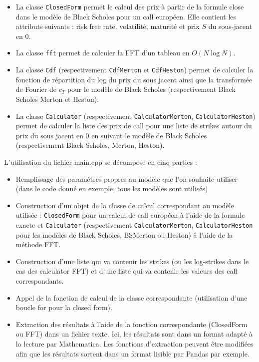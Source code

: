 \documentclass{article}
\begin{document}
\begin{itemize}
	\item La classe \lstinline{ClosedForm} permet le calcul des prix à partir de la formule close dans le modèle de Black Scholes pour un call européen. Elle contient les attributs suivants : risk free rate, volatilité, maturité et prix $S$ du sous-jacent en 0.
	\item La classe \lstinline{fft} permet de calculer la FFT d’un tableau en $O(N\log N)$.
	\item La classe \lstinline{Cdf} (respectivement \lstinline{CdfMerton} et \lstinline{CdfHeston}) permet de calculer la fonction de répartition du log du prix du sous jacent ainsi que la transformée de Fourier de $c_T$ pour le modèle de Black Scholes (respectivement Black Scholes Merton et Heston).
	\item La classe \lstinline{Calculator} (respectivement \lstinline{CalculatorMerton}, \lstinline{CalculatorHeston}) permet de calculer la liste des prix de call pour une liste de strikes autour du prix du sous jacent en 0 en suivant le modèle de Black Scholes (respectivement Black Scholes, Merton, Heston).
\end{itemize}
L’utilisation du fichier main.cpp se décompose en cinq parties :
\begin{itemize}
	\item Remplissage des paramètres propres au modèle que l’on souhaite utiliser (dans le code donné en exemple, tous les modèles sont utilisés)
        \item Construction d’un objet de la classe de calcul correspondant au modèle utilisée : \lstinline{ClosedForm} pour un calcul de call européen à l’aide de la formule exacte et \lstinline{Calculator} (respectivement \lstinline{CalculatorMerton}, \lstinline{CalculatorHeston} pour les modèles de Black Scholes, BSMerton ou Heston) à l'aide de la méthode FFT.
	\item Construction d’une liste qui va contenir les strikes (ou les log-strikes dans le cas des calculator FFT) et d’une liste qui va contenir les valeurs des call correspondants.
	\item Appel de la fonction de calcul de la classe correspondante (utilisation d’une boucle for pour la closed form).
	\item Extraction des résultats à l’aide de la fonction correspondante (ClosedForm ou FFT) dans un fichier texte. Ici, les résultats sont dans un format adapté à la lecture par Mathematica. Les fonctions d’extraction peuvent être modifiées afin que les résultats sortent dans un format lisible par Pandas par exemple.
\end{itemize}
\end{document}
